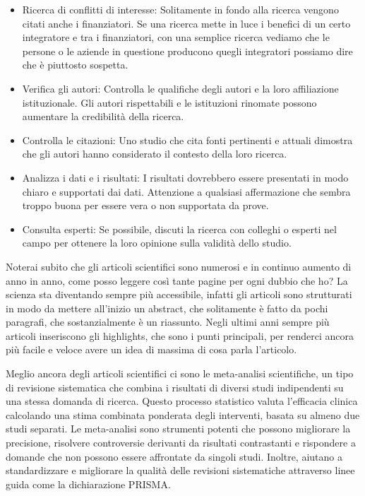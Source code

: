 \documentclass[12pt]{book} %
\begin{document}
\begin{itemize}
\item Ricerca di conflitti di interesse: Solitamente in fondo alla ricerca vengono citati anche i finanziatori. Se una
ricerca mette in luce i benefici di un certo integratore e tra i finanziatori, con una semplice ricerca vediamo che le
persone o le aziende in questione producono quegli integratori possiamo dire che è piuttosto sospetta.
\item Verifica gli autori: Controlla le qualifiche degli autori e la loro affiliazione istituzionale. Gli autori
rispettabili e le istituzioni rinomate possono aumentare la credibilità della ricerca.
\item Controlla le citazioni: Uno studio che cita fonti pertinenti e attuali dimostra che gli autori hanno considerato
il contesto della loro ricerca.
\item Analizza i dati e i risultati: I risultati dovrebbero essere presentati in modo chiaro e supportati dai dati.
Attenzione a qualsiasi affermazione che sembra troppo buona per essere vera o non supportata da prove.
\item Consulta esperti: Se possibile, discuti la ricerca con colleghi o esperti nel campo per ottenere la loro opinione
sulla validità dello studio.
\end{itemize}

\bigskip

Noterai subito che gli articoli scientifici sono numerosi e in continuo aumento di anno in anno, come posso leggere così
tante pagine per ogni dubbio che ho? La scienza sta diventando sempre più accessibile, infatti gli articoli sono
strutturati in modo da mettere all'inizio un abstract, che solitamente è fatto da pochi paragrafi,
che sostanzialmente è un riassunto. Negli ultimi anni sempre più articoli inseriscono gli highlights, che sono i punti
principali, per renderci ancora più facile e veloce avere un idea di massima di cosa parla
l'articolo.


\bigskip

Meglio ancora degli articoli scientifici ci sono le meta-analisi scientifiche, un tipo di revisione sistematica che
combina i risultati di diversi studi indipendenti su una stessa domanda di ricerca. Questo processo statistico valuta
l'efficacia clinica calcolando una stima combinata ponderata degli interventi, basata su almeno
due studi separati. Le meta-analisi sono strumenti potenti che possono migliorare la precisione, risolvere controversie
derivanti da risultati contrastanti e rispondere a domande che non possono essere affrontate da singoli studi. Inoltre,
aiutano a standardizzare e migliorare la qualità delle revisioni sistematiche attraverso linee guida come la
dichiarazione PRISMA.
\end{document}

